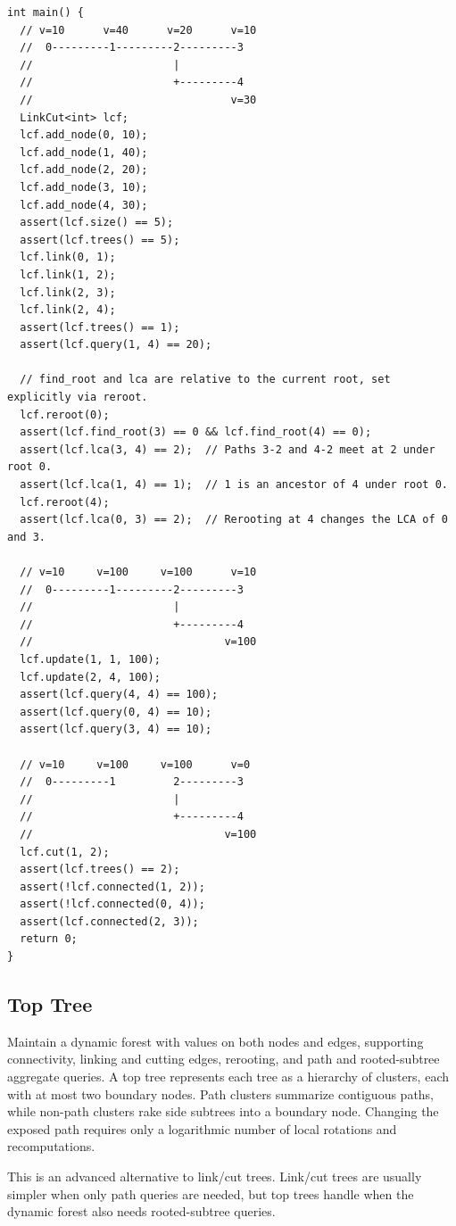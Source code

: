 \begin{lstlisting}[style=cpp]
int main() {
  // v=10      v=40      v=20      v=10
  //  0---------1---------2---------3
  //                      |
  //                      +---------4
  //                               v=30
  LinkCut<int> lcf;
  lcf.add_node(0, 10);
  lcf.add_node(1, 40);
  lcf.add_node(2, 20);
  lcf.add_node(3, 10);
  lcf.add_node(4, 30);
  assert(lcf.size() == 5);
  assert(lcf.trees() == 5);
  lcf.link(0, 1);
  lcf.link(1, 2);
  lcf.link(2, 3);
  lcf.link(2, 4);
  assert(lcf.trees() == 1);
  assert(lcf.query(1, 4) == 20);

  // find_root and lca are relative to the current root, set explicitly via reroot.
  lcf.reroot(0);
  assert(lcf.find_root(3) == 0 && lcf.find_root(4) == 0);
  assert(lcf.lca(3, 4) == 2);  // Paths 3-2 and 4-2 meet at 2 under root 0.
  assert(lcf.lca(1, 4) == 1);  // 1 is an ancestor of 4 under root 0.
  lcf.reroot(4);
  assert(lcf.lca(0, 3) == 2);  // Rerooting at 4 changes the LCA of 0 and 3.

  // v=10     v=100     v=100      v=10
  //  0---------1---------2---------3
  //                      |
  //                      +---------4
  //                              v=100
  lcf.update(1, 1, 100);
  lcf.update(2, 4, 100);
  assert(lcf.query(4, 4) == 100);
  assert(lcf.query(0, 4) == 10);
  assert(lcf.query(3, 4) == 10);

  // v=10     v=100     v=100      v=0
  //  0---------1         2---------3
  //                      |
  //                      +---------4
  //                              v=100
  lcf.cut(1, 2);
  assert(lcf.trees() == 2);
  assert(!lcf.connected(1, 2));
  assert(!lcf.connected(0, 4));
  assert(lcf.connected(2, 3));
  return 0;
}
\end{lstlisting}
\subsection{Top Tree}
\label{sec:2.8.11}
Maintain a dynamic forest with values on both nodes and edges, supporting connectivity, linking and cutting edges, rerooting, and path and rooted-subtree aggregate queries. A top tree represents each tree as a hierarchy of clusters, each with at most two boundary nodes. Path clusters summarize contiguous paths, while non-path clusters rake side subtrees into a boundary node. Changing the exposed path requires only a logarithmic number of local rotations and recomputations.

This is an advanced alternative to link/cut trees. Link/cut trees are usually simpler when only path queries are needed, but top trees handle when the dynamic forest also needs rooted-subtree queries.

